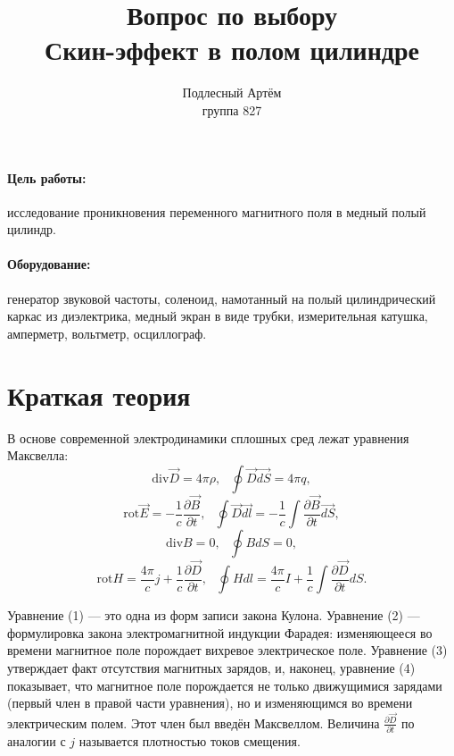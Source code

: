 \documentclass[a4paper, 14pt]{extarticle}%
\author{Подлесный Артём \\ группа 827}
\title{Вопрос по выбору \\ Скин-эффект в полом цилиндре}
\begin{document}
\maketitle

\paragraph*{Цель работы:} исследование проникновения переменного магнитного поля
в медный полый цилиндр.
\paragraph*{Оборудование:} генератор звуковой частоты, соленоид, намотанный на полый цилиндрический каркас из диэлектрика, медный экран
в виде трубки, измерительная катушка, амперметр, вольтметр, осциллограф.

\section*{Краткая теория}

В основе современной электродинамики сплошных сред лежат уравнения Максвелла: 
\begin{equation}
\text{div}\overrightarrow{D} = 4\pi \rho, \text{     }\oint \overrightarrow{D}\overrightarrow{dS} = 4\pi q,
\end{equation} 
\begin{equation}
\text{rot}\overrightarrow{E} = -\dfrac{1}{c}\dfrac{\partial\overrightarrow{B}}{\partial t}, \text{     }\oint \overrightarrow{D}\overrightarrow{dl} = - \dfrac{1}{c}\int \dfrac{\partial\overrightarrow{B}}{\partial t} \overrightarrow{dS} ,
\end{equation} 
\begin{equation}
\text{div} B = 0, \text{   } \oint BdS = 0,
\end{equation}
\begin{equation}
\text{rot} H = \frac{4\pi}{c}j + \dfrac{1}{c}\dfrac{\partial\overrightarrow{D}}{\partial t}  , \text{   } \oint Hdl =\frac{4\pi}{c}I +\dfrac{1}{c}\int \dfrac{\partial\overrightarrow{D}}{\partial t}dS.
\end{equation}

Уравнение (1) — это одна из форм записи закона Кулона. Уравнение (2) —
формулировка закона электромагнитной индукции Фарадея: изменяющееся
во времени магнитное поле порождает вихревое электрическое поле. Уравнение (3) утверждает факт отсутствия магнитных зарядов, и, наконец, уравнение (4) показывает, что магнитное поле порождается не только движущимися
зарядами (первый член в правой части уравнения), но
и изменяющимся во времени электрическим полем. Этот член был введён Максвеллом. Величина $\frac{\partial\overrightarrow{D}}{\partial t}$ по аналогии с $j$ называется плотностью токов смещения.
\end{document}
